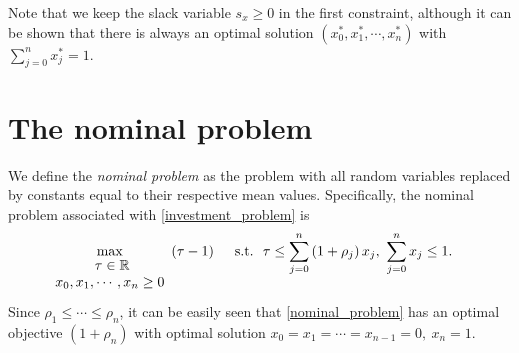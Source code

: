 \documentclass[11pt]{article}
\begin{document}
Note that we keep the slack variable $s_x \geq 0$ in the first constraint, although it can be shown that there is always an optimal solution $\left(x_0^*, x_1^*, \cdots, x_n^*\right)$ with $\sum_{j=0}^n x_j^* = 1$.

\section*{The nominal problem}
We define the \textit{nominal problem} as the problem with all random variables replaced by constants equal to their respective mean values. Specifically, the nominal problem associated with \eqref{investment_problem} is
\begin{align}\label{nominal_problem}
& \max_{\begin{matrix}\
	\tau \in \mathbb{R} \\
	x_0, x_1, \cdots, x_n \geq 0
	\end{matrix}}\ \left(\tau - 1\right)\ \ \ \ \textnormal{s.t.}\ \ \tau \leq \sum_{j=0}^n \left(1+\rho_j\right) x_j,\  \sum_{j=0}^n x_j \leq 1.
\end{align}
Since $\rho_1 \leq \cdots \leq \rho_n$,  it can be easily seen that \eqref{nominal_problem} has an optimal objective $(1+\rho_n)$ with optimal solution $x_0 = x_1 = \cdots = x_{n-1}=0,\ x_n=1$.

{}

\end{document}
